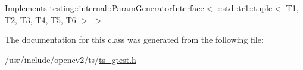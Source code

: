 Implements \hyperlink{classtesting_1_1internal_1_1ParamGeneratorInterface_ae82e6fc79efcef1c794ad333ffb5bf80}{testing\-::internal\-::\-Param\-Generator\-Interface$<$ \-::std\-::tr1\-::tuple$<$ T1, T2, T3, T4, T5, T6 $>$ $>$}.



The documentation for this class was generated from the following file\-:\begin{DoxyCompactItemize}
\item 
/usr/include/opencv2/ts/\hyperlink{ts__gtest_8h}{ts\-\_\-gtest.\-h}\end{DoxyCompactItemize}
